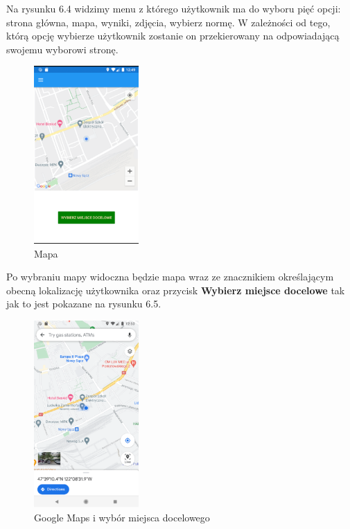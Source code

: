 Na rysunku 6.4 widzimy menu z którego użytkownik ma do wyboru pięć opcji: strona główna, mapa, wyniki, zdjęcia, wybierz normę. W zależności od tego, którą opcję wybierze użytkownik zostanie on przekierowany na odpowiadającą swojemu wyborowi stronę.

\begin{figure}[!htb]
	\begin{center}
		\includegraphics[width=4cm]{rys/ZZp1.png}
		\caption{Mapa}
		\label{rys:rysunek045}
	\end{center}
\end{figure}

Po wybraniu mapy widoczna będzie mapa wraz ze znacznikiem określającym obecną lokalizację użytkownika oraz przycisk \textbf{Wybierz miejsce docelowe} tak jak to jest pokazane na rysunku 6.5.

\begin{figure}[!htb]
	\begin{center}
		\includegraphics[width=4cm]{rys/ZZp2.png}
		\caption{Google Maps i wybór miejsca docelowego}
		\label{rys:rysunek046}
	\end{center}
\end{figure}

